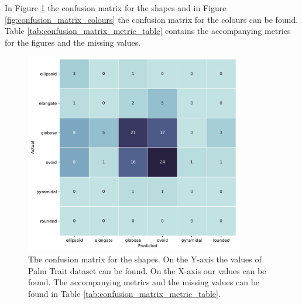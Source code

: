 \documentclass[a4paper, 12pt, oneside]{book} %
\begin{document}
In Figure \ref{fig:confusion_matrix_shapes} the confusion matrix for the shapes and in Figure \ref{fig:confusion_matrix_colours} the confusion matrix for the colours can be found.
Table \ref{tab:confusion_matrix_metric_table} contains the accompanying metrics for the figures and the missing values.

\begin{figure}[htpb]
    \centering
    \includegraphics[width=0.85\textwidth]{figures/confusion_matrix_shapes.pdf}
    \caption[Confusion matrix shapes]{The confusion matrix for the shapes. On the Y-axis the values of Palm Trait dataset can be found. On the X-axis our values can be found. The accompanying metrics and the missing values can be found in Table \ref{tab:confusion_matrix_metric_table}.}
    \label{fig:confusion_matrix_shapes}
\end{figure}
\end{document}
